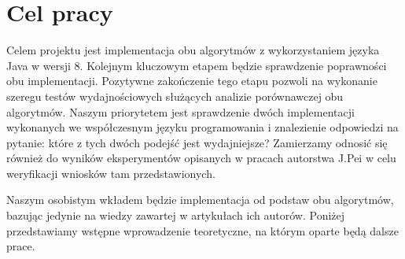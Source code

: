 \section{Cel pracy}

Celem projektu jest implementacja obu algorytmów z wykorzystaniem języka Java w wersji 8.
Kolejnym kluczowym etapem będzie sprawdzenie poprawności obu implementacji.
Pozytywne zakończenie tego etapu pozwoli na wykonanie szeregu testów wydajnościowych służących analizie porównawczej obu algorytmów.
Naszym priorytetem jest sprawdzenie dwóch implementacji wykonanych we współczesnym języku programowania i znalezienie odpowiedzi na pytanie: które z tych dwóch podejść jest wydajniejsze?
Zamierzamy odnosić się również do wyników eksperymentów opisanych w pracach autorstwa J.Pei \cite{closetArt} w celu weryfikacji wniosków tam przedstawionych.

Naszym osobistym wkładem będzie implementacja od podstaw obu algorytmów, bazując jedynie na wiedzy zawartej w artykułach ich autorów.
Poniżej przedstawiamy wstępne wprowadzenie teoretyczne, na którym oparte będą dalsze prace.